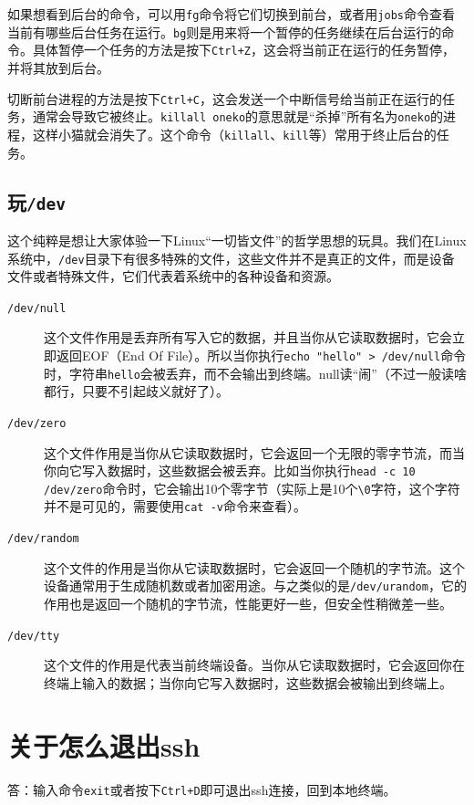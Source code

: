 \documentclass[12pt]{ctexart}
\begin{document}
如果想看到后台的命令，可以用\texttt{fg}命令将它们切换到前台，或者用\texttt{jobs}命令查看当前有哪些后台任务在运行。\texttt{bg}则是用来将一个暂停的任务继续在后台运行的命令。具体暂停一个任务的方法是按下\texttt{Ctrl+Z}，这会将当前正在运行的任务暂停，并将其放到后台。

切断前台进程的方法是按下\texttt{Ctrl+C}，这会发送一个中断信号给当前正在运行的任务，通常会导致它被终止。\texttt{killall oneko}的意思就是“杀掉”所有名为\texttt{oneko}的进程，这样小猫就会消失了。这个命令（\texttt{killall}、\texttt{kill}等）常用于终止后台的任务。

\subsection{玩\texttt{/dev}}
这个纯粹是想让大家体验一下Linux“一切皆文件”的哲学思想的玩具。我们在Linux系统中，\texttt{/dev}目录下有很多特殊的文件，这些文件并不是真正的文件，而是设备文件或者特殊文件，它们代表着系统中的各种设备和资源。
\begin{description}
    \item[\texttt{/dev/null}] 这个文件作用是丢弃所有写入它的数据，并且当你从它读取数据时，它会立即返回EOF（End Of File）。所以当你执行\texttt{echo "hello" > /dev/null}命令时，字符串\texttt{hello}会被丢弃，而不会输出到终端。null读“闹”（不过一般读啥都行，只要不引起歧义就好了）。
    \item[\texttt{/dev/zero}] 这个文件作用是当你从它读取数据时，它会返回一个无限的零字节流，而当你向它写入数据时，这些数据会被丢弃。比如当你执行\texttt{head -c 10 /dev/zero}命令时，它会输出10个零字节（实际上是10个\texttt{\textbackslash 0}字符，这个字符并不是可见的，需要使用\texttt{cat -v}命令来查看）。
    \item[\texttt{/dev/random}] 这个文件的作用是当你从它读取数据时，它会返回一个随机的字节流。这个设备通常用于生成随机数或者加密用途。与之类似的是\texttt{/dev/urandom}，它的作用也是返回一个随机的字节流，性能更好一些，但安全性稍微差一些。
    \item[\texttt{/dev/tty}] 这个文件的作用是代表当前终端设备。当你从它读取数据时，它会返回你在终端上输入的数据；当你向它写入数据时，这些数据会被输出到终端上。 
\end{description}

\section{关于怎么退出ssh}

答：输入命令\texttt{exit}或者按下\texttt{Ctrl+D}即可退出ssh连接，回到本地终端。
\end{document}
